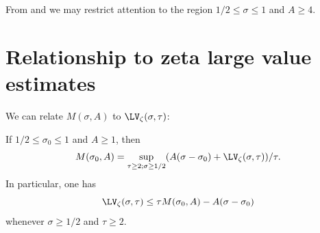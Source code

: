 From  and  we may restrict attention to the region $1/2 \leq \sigma \leq 1$ and $A \geq 4$.

\section{Relationship to zeta large value estimates}

We can relate $M(\sigma,A)$ to $\LV_\zeta(\sigma,\tau)$:

\begin{lemma}\label{mad}  If $1/2 \leq \sigma_0 \leq 1$ and $A \geq 1$, then
\begin{equation}\label{M-form}
 M(\sigma_0,A) = \sup_{\tau \geq 2; \sigma \geq 1/2} (A(\sigma-\sigma_0) + \LV_\zeta(\sigma,\tau))/\tau.
\end{equation}
In particular, one has
$$ \LV_\zeta(\sigma,\tau) \leq \tau M(\sigma_0,A) - A(\sigma-\sigma_0)$$
whenever $\sigma \geq 1/2$ and $\tau \geq 2$.
\end{lemma}

